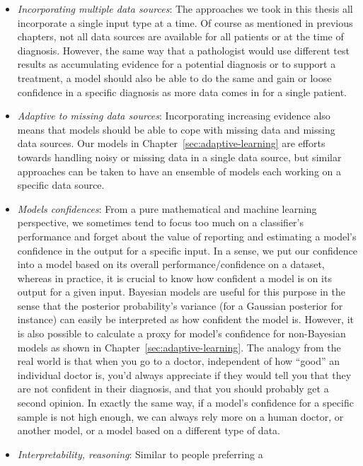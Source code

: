 \begin{itemize}
  \item \emph{Incorporating multiple data sources}: The approaches we took in
    this thesis all incorporate a single input type at a time. Of course as
    mentioned in previous chapters, not all data sources are available for all
    patients or at the time of diagnosis. However, the same way that a
    pathologist would use different test results as accumulating evidence for a
    potential diagnosis or to support a treatment, a model should also be able
    to do the same and gain or loose confidence in a specific diagnosis as more
    data comes in for a single patient.
  \item \emph{Adaptive to missing data sources}: Incorporating increasing
    evidence also means that models should be able to cope with missing data
    and missing data sources. Our models in Chapter~\ref{sec:adaptive-learning}
    are efforts towards handling noisy or missing data in a single data source,
    but similar approaches can be taken to have an ensemble of models each
    working on a specific data source.
  \item \emph{Models confidences}: From a pure mathematical and machine
    learning perspective, we sometimes tend to focus too much on a classifier's
    performance and forget about the value of reporting and estimating a
    model's confidence in the output for a specific input. In a sense, we put
    our confidence into a model based on its overall performance/confidence on
    a dataset, whereas in practice, it is crucial to know how confident a model
    is on its output for a given input. Bayesian models are useful for this
    purpose in the sense that the posterior probability's variance (for a
    Gaussian posterior for instance) can easily be interpreted as how confident
    the model is. However, it is also possible to calculate a proxy for model's
    confidence for non-Bayesian models as shown in
    Chapter~\ref{sec:adaptive-learning}. The analogy from the real world is
    that when you go to a doctor, independent of how ``good'' an individual
    doctor is, you'd always appreciate if they would tell you that they are not
    confident in their diagnosis, and that you should probably get a second
    opinion. In exactly the same way, if a model's confidence for a specific
    sample is not high enough, we can always rely more on a human doctor, or
    another model, or a model based on a different type of data.
  \item \emph{Interpretability, reasoning}: Similar to people preferring a

\end{itemize}

